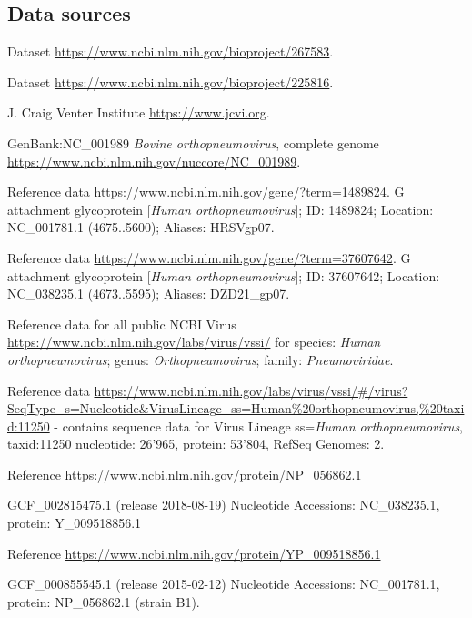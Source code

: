 \documentclass{article} %
\begin{document}
\begin{description}[noitemsep]
\end{description}

\subsection{Data sources}
\begin{description}[noitemsep]
\item Dataset \url{https://www.ncbi.nlm.nih.gov/bioproject/267583}.
\item Dataset \url{https://www.ncbi.nlm.nih.gov/bioproject/225816}.
\item J. Craig Venter Institute \url{https://www.jcvi.org}.
\item GenBank:NC\_001989 \textit{Bovine orthopneumovirus}, complete genome \url{https://www.ncbi.nlm.nih.gov/nuccore/NC_001989}.
\item Reference data \url{https://www.ncbi.nlm.nih.gov/gene/?term=1489824}.
G attachment glycoprotein [\textit{Human orthopneumovirus}]; ID: 1489824; Location: NC\_001781.1 (4675..5600); Aliases: HRSVgp07.
\item Reference data \url{https://www.ncbi.nlm.nih.gov/gene/?term=37607642}. 
G attachment glycoprotein [\textit{Human orthopneumovirus}]; ID: 37607642; Location: NC\_038235.1 (4673..5595); Aliases: DZD21\_gp07.
\item Reference data for all public NCBI Virus 
\url{https://www.ncbi.nlm.nih.gov/labs/virus/vssi/} for species: \textit{Human orthopneumovirus}; genus: \textit{Orthopneumovirus}; family: \textit{Pneumoviridae}.
\item Reference data \url{https://www.ncbi.nlm.nih.gov/labs/virus/vssi/#/virus?SeqType_s=Nucleotide&VirusLineage_ss=Human\%20orthopneumovirus,\%20taxid:11250}
- contains sequence data for 
Virus Lineage ss=\textit{Human orthopneumovirus}, taxid:11250
nucleotide: 26’965, 
protein: 53’804, 
RefSeq Genomes: 2.
\item Reference \url{https://www.ncbi.nlm.nih.gov/protein/NP_056862.1}
\item GCF\_002815475.1	(release 2018-08-19) Nucleotide Accessions: NC\_038235.1, protein: Y\_009518856.1
\item Reference \url{https://www.ncbi.nlm.nih.gov/protein/YP_009518856.1}
\item GCF\_000855545.1	(release 2015-02-12) Nucleotide Accessions: NC\_001781.1, protein: NP\_056862.1 (strain B1).
\end{description}
\end{document}
